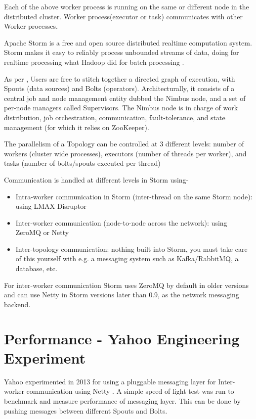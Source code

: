 \documentclass[9pt,twocolumn,twoside]{styles/osajnl}
\begin{document}
Each of the above worker process is running on the same or different
node in the distributed cluster. Worker process(executor or task)
communicates with other Worker processes.

Apache Storm is a free and open source distributed realtime
computation system. Storm makes it easy to reliably process unbounded
streams of data, doing for realtime processing what Hadoop did for
batch processing \cite{www-storm}.

As per \cite{article-nabi2014streams}, Users are free to stitch
together a directed graph of execution, with Spouts (data sources) and
Bolts (operators). Architecturally, it consists of a central job and
node management entity dubbed the Nimbus node, and a set of per-node
managers called Supervisors. The Nimbus node is in charge of work
distribution, job orchestration, communication, fault-tolerance, and
state management (for which it relies on ZooKeeper).

The parallelism of a Topology can be controlled at 3 different levels:
number of workers (cluster wide processes), executors (number of
threads per worker), and tasks (number of bolts/spouts executed per
thread)

Communication is handled at different levels in Storm using-
\begin{itemize}
  \renewcommand{\labelitemi}{\scriptsize$\square$}
        \item Intra-worker communication in Storm (inter-thread on the
          same Storm node): using LMAX Disruptor
        \item Inter-worker communication (node-to-node across
          the network): using ZeroMQ or Netty
        \item Inter-topology communication: nothing
built into Storm, you must take care of this yourself with e.g. a
messaging system such as Kafka/RabbitMQ, a database, etc.
\end{itemize}

For inter-worker communication Storm uses ZeroMQ by default in older
versions and can use Netty in Storm versions later than 0.9, as the
network messaging backend.

\section{Performance - Yahoo Engineering Experiment}

Yahoo experimented in 2013 for using a pluggable messaging layer for
Inter-worker communication using Netty \cite{article-storm-netty}. A
simple speed of light test was run to benchmark and measure
performance of messaging layer. This can be done by pushing messages
between different Spouts and Bolts.
\end{document}

